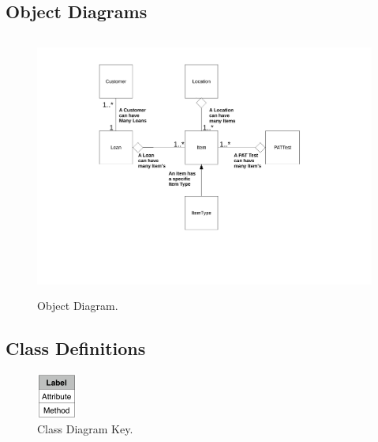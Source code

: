 \begin{landscape}

\subsection{Object Diagrams}

\begin{figure}[H]
    \begin{center}
    \includegraphics[height=325px]{./Design/Object_Diagrams/Object_diagrams.pdf}
    \caption{Object Diagram.} \label{fig:object_diagram}
    \end{center}
\end{figure}

\newpage

\subsection{Class Definitions}

\begin{figure}[H]
    \centerline{\includegraphics[width=50px]{./Design/Class_Definitions/Class_definition_key.pdf}}
    \caption{Class Diagram Key.} \label{fig:relationship_diagram}
\end{figure}


\end{landscape}
